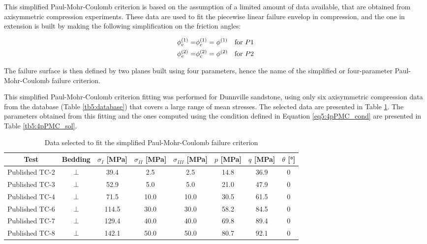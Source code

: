 This simplified Paul-Mohr-Coulomb criterion is based on the assumption of a limited amount of data available, that are obtained from axisymmetric compression experiments. These data are used to fit the piecewise linear failure envelop in compression, and the one in extension is built by making the following simplification on the friction angles:

\begin{align}\label{eq5:4pPMC_cond}
    \phi_e^{(1)} = &\phi_c^{(1)} = \phi^{(1)} \quad \textmd{for $P1$}\\
    \phi_e^{(2)} = &\phi_c^{(2)} = \phi^{(2)} \quad \textmd{for $P2$}
\end{align}

The failure surface is then defined by two planes built using four parameters, hence the name of the simplified or four-parameter Paul-Mohr-Coulomb failure criterion. 

This simplified Paul-Mohr-Coulomb criterion fitting was performed for Dunnville sandstone, using only six axisymmetric compression data from the database (Table \ref{tb5:database}) that covers a large range of mean stresses. The selected data are presented in Table \ref{tb5:4pPMC_data}. The parameters obtained from this fitting and the ones computed using the condition defined in Equation \ref{eq5:4pPMC_cond} are presented in Table \ref{tb5:4pPMC_sol}. 

\begin{table}[h!]
    \centering
    \captionsetup{justification=centering}
    \caption{Data selected to fit the simplified Paul-Mohr-Coulomb failure criterion}
    \begin{tabular}{cccccccc}
        \hline 
        Test & Bedding & $\sigma_I$ [\si{MPa}] & $\sigma_{II}$ [\si{MPa}] &$\sigma_{III}$ [\si{MPa}] & $p$ [\si{MPa}] & $q$ [\si{MPa}] & $\theta$ [\si{\degree}] \\
        \hline
        \hline
        Published TC-2 & \(\perp\) & 39.4 & 2.5 & 2.5 & 14.8 & 36.9 & 0 \\
        Published TC-3 & \(\perp\) & 52.9 & 5.0 & 5.0 & 21.0 & 47.9 & 0 \\
        Published TC-4 & \(\perp\) & 71.5 & 10.0 & 10.0 & 30.5 & 61.5 & 0 \\
        Published TC-6 & \(\perp\) & 114.5 & 30.0 & 30.0 & 58.2 & 84.5 & 0 \\
        Published TC-7 & \(\perp\)& 129.4 & 40.0 & 40.0 & 69.8 & 89.4 & 0 \\
        Published TC-8 & \(\perp\) & 142.1 & 50.0 & 50.0 & 80.7 & 92.1 & 0 \\
        \hline
    \end{tabular}
    \label{tb5:4pPMC_data}
\end{table}

